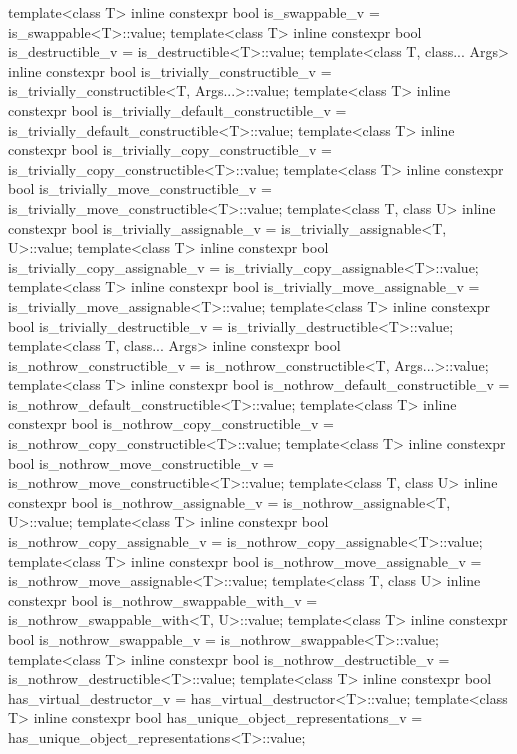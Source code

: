 \begin{codeblock}
{  template<class T>
    inline constexpr bool is_swappable_v = is_swappable<T>::value;
  template<class T>
    inline constexpr bool is_destructible_v = is_destructible<T>::value;
  template<class T, class... Args>
    inline constexpr bool is_trivially_constructible_v
      = is_trivially_constructible<T, Args...>::value;
  template<class T>
    inline constexpr bool is_trivially_default_constructible_v
      = is_trivially_default_constructible<T>::value;
  template<class T>
    inline constexpr bool is_trivially_copy_constructible_v
      = is_trivially_copy_constructible<T>::value;
  template<class T>
    inline constexpr bool is_trivially_move_constructible_v
      = is_trivially_move_constructible<T>::value;
  template<class T, class U>
    inline constexpr bool is_trivially_assignable_v = is_trivially_assignable<T, U>::value;
  template<class T>
    inline constexpr bool is_trivially_copy_assignable_v
      = is_trivially_copy_assignable<T>::value;
  template<class T>
    inline constexpr bool is_trivially_move_assignable_v
      = is_trivially_move_assignable<T>::value;
  template<class T>
    inline constexpr bool is_trivially_destructible_v = is_trivially_destructible<T>::value;
  template<class T, class... Args>
    inline constexpr bool is_nothrow_constructible_v
      = is_nothrow_constructible<T, Args...>::value;
  template<class T>
    inline constexpr bool is_nothrow_default_constructible_v
      = is_nothrow_default_constructible<T>::value;
  template<class T>
    inline constexpr bool is_nothrow_copy_constructible_v
    = is_nothrow_copy_constructible<T>::value;
  template<class T>
    inline constexpr bool is_nothrow_move_constructible_v
      = is_nothrow_move_constructible<T>::value;
  template<class T, class U>
    inline constexpr bool is_nothrow_assignable_v = is_nothrow_assignable<T, U>::value;
  template<class T>
    inline constexpr bool is_nothrow_copy_assignable_v = is_nothrow_copy_assignable<T>::value;
  template<class T>
    inline constexpr bool is_nothrow_move_assignable_v = is_nothrow_move_assignable<T>::value;
  template<class T, class U>
    inline constexpr bool is_nothrow_swappable_with_v = is_nothrow_swappable_with<T, U>::value;
  template<class T>
    inline constexpr bool is_nothrow_swappable_v = is_nothrow_swappable<T>::value;
  template<class T>
    inline constexpr bool is_nothrow_destructible_v = is_nothrow_destructible<T>::value;
  template<class T>
    inline constexpr bool has_virtual_destructor_v = has_virtual_destructor<T>::value;
  template<class T>
    inline constexpr bool has_unique_object_representations_v
      = has_unique_object_representations<T>::value;

}
\end{codeblock}
